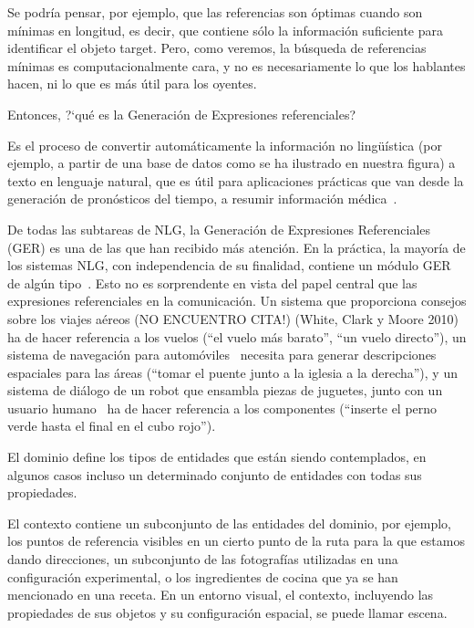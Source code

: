 Se podr\'{i}a pensar, por ejemplo, que las referencias son \'optimas cuando son m\'{i}nimas en longitud, es decir, 
que contiene s\'olo la informaci\'on suficiente para identificar el objeto target. Pero, como veremos, la b\'usqueda de referencias m\'{i}nimas
es computacionalmente cara, y no es necesariamente lo que los hablantes hacen, ni lo que es m\'as \'util para los oyentes.


Entonces,  ?`qu\'e es la Generaci\'on de Expresiones referenciales? 

Es el proceso de convertir autom\'aticamente la informaci\'on no ling\"u\'{i}stica (por ejemplo, a partir de una base de datos como se ha ilustrado en nuestra figura) a texto en lenguaje natural, que es \'util para aplicaciones pr\'acticas que van desde la generaci\'on de pron\'osticos del tiempo, a resumir informaci\'on m\'edica~\cite{dale2000}.

De todas las subtareas de NLG, la Generaci\'on de Expresiones Referenciales (GER) es
una de las que han recibido m\'as atenci\'on. En la pr\'actica, la mayor\'ia de los
sistemas NLG, con independencia de su finalidad,
contiene un m\'odulo GER de alg\'un tipo~\cite{Mellish2004}. Esto no es sorprendente
en vista del papel central que las expresiones referenciales en la comunicaci\'on. Un sistema que proporciona
consejos sobre los viajes a\'ereos (NO ENCUENTRO CITA!) (White, Clark y Moore 2010) ha de hacer referencia a los vuelos (``el
vuelo m\'as barato'', ``un vuelo directo''), un sistema de navegaci\'on para autom\'oviles~\cite{Drager:2012:GLN:2380816.2380908}
necesita para generar descripciones espaciales para las \'areas (``tomar el puente junto a la iglesia a la derecha''),
y un sistema de di\'alogo de un robot que ensambla piezas de juguetes, junto con un usuario humano~\cite{foster-etal-ijcai2009} ha de hacer referencia a los componentes (``inserte el perno verde hasta el final en el cubo rojo'').

El dominio define los tipos de entidades que est\'an siendo contemplados, en algunos
casos incluso un determinado conjunto de entidades con todas sus propiedades.

El contexto contiene un subconjunto de las entidades del dominio, por ejemplo, los puntos de referencia visibles en un cierto punto de la ruta para la que estamos dando direcciones, un
subconjunto de las fotograf\'ias utilizadas en una configuraci\'on experimental, o los ingredientes de cocina que ya se han mencionado en una receta. En un entorno visual, el contexto, incluyendo las
propiedades de sus objetos y su configuraci\'on espacial, se puede llamar escena. 

